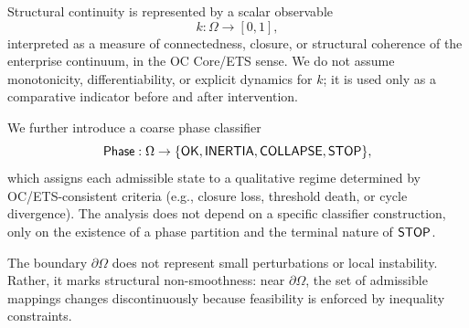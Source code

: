 Structural continuity is represented by a scalar observable
\[
k:\Omega \to [0,1],
\]
interpreted as a measure of connectedness, closure, or structural coherence of
the enterprise continuum, in the OC Core/ETS sense.
We do not assume monotonicity, differentiability, or explicit dynamics for $k$;
it is used only as a comparative indicator before and after intervention.

We further introduce a coarse phase classifier
\[
\mathsf{Phase}:\Omega \to \{\mathsf{OK},\mathsf{INERTIA},\mathsf{COLLAPSE},\mathsf{STOP}\},
\]
which assigns each admissible state to a qualitative regime determined by
OC/ETS-consistent criteria (e.g., closure loss, threshold death, or cycle
divergence).
The analysis does not depend on a specific classifier construction, only on the
existence of a phase partition and the terminal nature of $\mathsf{STOP}$.

\begin{remark}
The boundary $\partial\Omega$ does not represent small perturbations or local
instability.
Rather, it marks structural non-smoothness: near $\partial\Omega$, the set of
admissible mappings changes discontinuously because feasibility is enforced by
inequality constraints.
\end{remark}
